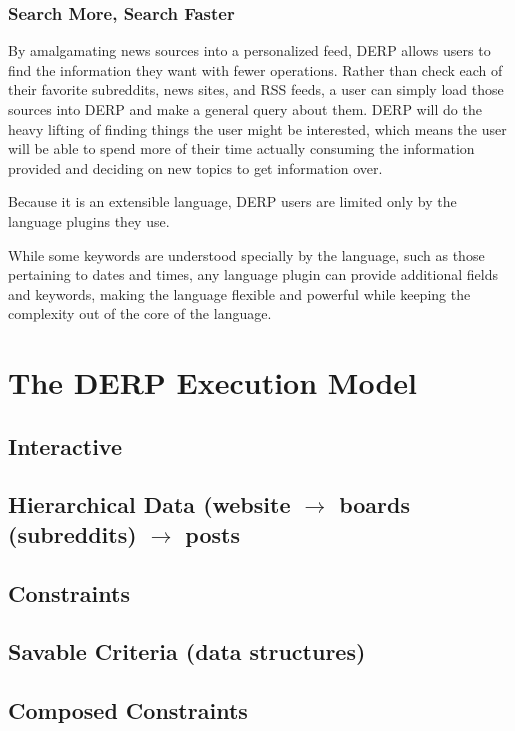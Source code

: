 \documentclass{article}
\begin{document}
\subsubsection{Search More, Search Faster}
By amalgamating news sources into a personalized feed, DERP allows users to find the information they want with fewer operations. Rather than check each of their favorite subreddits, news sites, and RSS feeds, a user can simply load those sources into DERP and make a general query about them. DERP will do the heavy lifting of finding things the user might be interested, which means the user will be able to spend more of their time actually consuming the information provided and deciding on new topics to get information over.

Because it is an extensible language, DERP users are limited only by the language plugins they use. 
\begin{comment}
@ADS Is this also something we officially decided on? I felt that we were leaning toward it
\end{comment}
While some keywords are understood specially by the language, such as those pertaining to dates and times, any language plugin can provide additional fields and keywords, making the language flexible and powerful while keeping the complexity out of the core of the language.


\newpage
\section{\textbf{The DERP Execution Model}}
\subsection{Interactive}
\subsection{Hierarchical Data (website $\rightarrow$ boards (subreddits) $\rightarrow$ posts}
\subsection{Constraints}
\subsection{Savable Criteria (data structures)}
\subsection{Composed Constraints}
\end{document}
